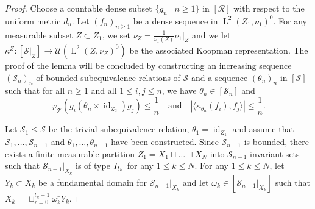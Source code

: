 \documentclass[11pt]{amsart}
\numberwithin{equation}{section}
\theoremstyle{plain}
\theoremstyle{definition}
\newcommand{\id}{\operatorname{id}}
\newcommand{\rL}{\operatorname{L}}
\begin{document}
\begin{proof}  Choose a countable dense subset $\{g_n \mid n \geq 1\}$ in $[\mathscr R]$ with respect to the uniform metric $d_u$. Let $(f_n)_{n\ge 1}$ be a dense sequence in $\rL^2(Z_1,\nu_1)^{0}$.  
For any measurable subset $Z\subset Z_1$, we set $\nu_Z=\frac{1}{\nu_1(Z)}\nu_1|_{Z}$ and we let $\kappa^{Z}: [\mathscr S|_{Z}]\to \mathscr U(\rL^2(Z,\nu_Z)^{0})$ be the associated Koopman representation. The proof of the lemma will be concluded by constructing an increasing sequence $(\mathscr S_n)_n$ of bounded subequivalence relations of $\mathscr S$ and a sequence $(\theta_n)_n$ in $[\mathscr S]$ such that for all $n \geq 1$ and all $1\leq i,j\leq n$, we have $\theta_n \in [\mathscr S_n]$ and
\begin{equation*}
\varphi_{\mathscr T}(g_i (\theta_n\times \id_{Z_2}) g_j)\leq \frac{1}{n} \quad \text{and} \quad |\langle \kappa_{\theta_n}(f_i),f_j  \rangle|\leq \frac{1}{n}.
\end{equation*}



Let $\mathscr S_1 \leq \mathscr S$ be the trivial subequivalence relation, $\theta_1 = \id_{Z_1}$ and assume that $\mathscr S_1, \dots, \mathscr S_{n-1}$ and $\theta_1,\dots,\theta_{n-1}$ have been constructed. 
Since $\mathscr S_{n-1}$ is bounded, there exists a finite measurable partition $Z_1=X_1 \sqcup \dots \sqcup X_{N}$ into $\mathscr S_{n-1}$-invariant sets such that $\mathscr S_{n-1}|_{X_{k}}$ is of type ${\rm I}_{t_k}$ for any $1\leq k\leq N$. For any $1\leq k\leq N$, let $Y_k\subset X_k$ be a fundamental domain for $\mathscr S_{n-1}|_{X_k}$ and let $\omega_k\in[\mathscr S_{n-1}|_{X_k}]$ such that $X_k=\sqcup_{r=0}^{t_k-1}\omega_k^r Y_k$.



\end{proof}
\end{document}
